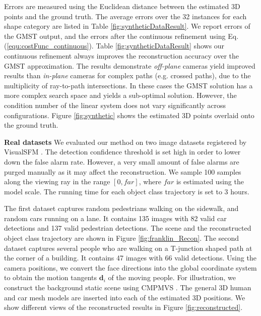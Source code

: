 Errors are measured using the Euclidean distance between the estimated 3D points and the ground truth. The average errors over the 32 instances for each shape category are listed in Table \ref{fig:syntheticDataResult}. We report errors of the GMST output, and the errors after the continuous refinement using Eq. (\ref{equ:costFunc_continuous}).  Table \ref{fig:syntheticDataResult} shows our  continuous refinement always improves the reconstruction accuracy over the GMST approximation.  The results demonstrate    {\it off-plane} cameras yield improved results than {\it in-plane}  cameras  for  complex paths (e.g. crossed paths), due to the multiplicity of ray-to-path intersections. In these cases the GMST solution has a more complex search space and yields a sub-optimal solution. However, the condition number of the linear system does not vary significantly across configurations. Figure \ref{fig:synthetic} shows the estimated 3D points overlaid onto the ground truth.


\textbf{Real datasets} We evaluated our method on two image datasets  registered by VisualSFM \cite{WuVSFM}. The detection confidence threshold  is set high in order to lower down the false alarm rate. However, a very small amount of false alarms are purged manually as it may affect the reconstruction.  We sample 100 samples along the viewing ray in the range $[0,far]$, where $far$ is  estimated using the model scale. The running time for each object class trajectory is set to 3 hours.

The first dataset captures random pedestrians walking on the sidewalk, and random cars running on a lane. It contains 135 images with 82 valid car detections and 137 valid pedestrian detections. The scene and the reconstructed object class trajectory are shown in Figure \ref{fig:franklin_Recon}. %
The second dataset captures several people who are walking on a T-junction shaped path at the corner of a building. It contains 47 images with 66 valid detections. Using the camera positions, we convert the face directions into the global coordinate system to obtain the motion tangents $\mathbf d_i$ of the moving people. For illustration, we construct the background static scene using CMPMVS \cite{JAN}. The general 3D human and car mesh models are inserted into each of the estimated 3D positions. We show different views of the reconstructed results in Figure \ref{fig:reconstructed}.

